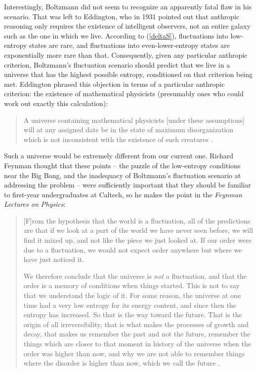 \documentclass[12pt,letterpaper]{article}
\begin{document}
Interestingly, Boltzmann did not seem to recognize an apparently fatal flaw in his scenario. 
That was left to Eddington, who in 1931 pointed out that anthropic reasoning only requires the existence of intelligent observers, not an entire galaxy such as the one in which we live.
According to (\ref{deltaS}), fluctuations into low-entropy states are rare, and fluctuations into even-lower-entropy states are exponentially more rare than that.
Consequently, given any particular anthropic criterion, Boltzmann's fluctuation scenario should predict that we live in a universe that has the highest possible entropy, conditioned on that criterion being met.
Eddington phrased this objection in terms of a particular anthropic criterion: the existence of mathematical physicists (presumably ones who could work out exactly this calculation):
\begin{quote}
A universe containing mathematical physicists [under these assumptions] will at any assigned date be in the state of maximum disorganization which is not inconsistent with the existence of such creatures \cite{eddington}.
\end{quote}
Such a universe would be extremely different from our current one.
Richard Feynman thought that these points -- the puzzle of the low-entropy conditions near the Big Bang, and the inadequacy of Boltzmann's fluctuation scenario at addressing the problem -- were sufficiently important that they should be familiar to first-year undergraduates at Caltech, so he makes the point in the \emph{Feynman Lectures on Physics}:
\begin{quote}
[F]rom the hypothesis that the world is a fluctuation, all of the predictions are that if we look at a part of the world we have never seen before, we will find it mixed up, and not like the piece we just looked at. If our order were due to a fluctuation, we would not expect order anywhere but where we have just noticed it.

We therefore conclude that the universe is \emph{not} a fluctuation, and that the order is a memory of conditions when things started. This is not to say that we understand the logic of it. For some reason, the universe at one time had a very low entropy for its energy content, and since then the entropy has increased. So that is the way toward the future. That is the origin of all irreversibility, that is what makes the processes of growth and decay, that makes us remember the past and not the future, remember the things which are closer to that moment in history of the universe when the order was higher than now, and why we are not able to remember things where the disorder is higher than now, which we call the future \cite{feynman}.
\end{quote}
\end{document}
